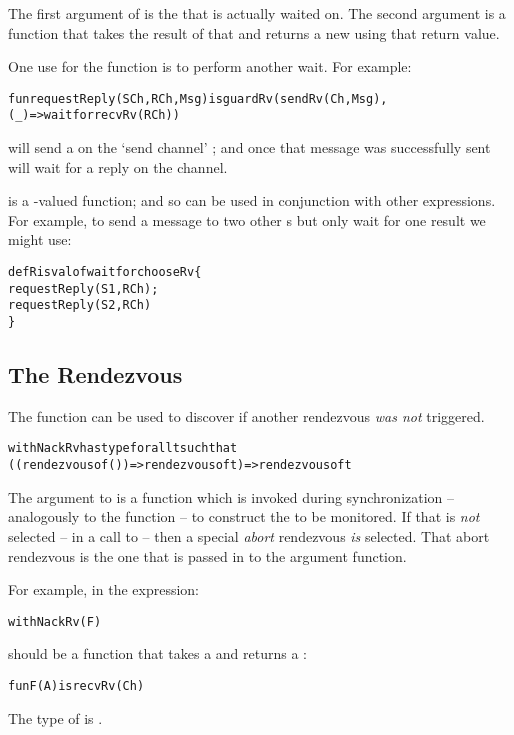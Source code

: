 The first argument of  is the  that is actually waited on. The second argument is a function that takes the result of that  and returns a new  using that return value.

One use for the  function is to perform another  wait. For example:
\begin{alltt}
fun requestReply(SCh,RCh,Msg) is guardRv(sendRv(Ch,Msg),
                                (_) => wait for recvRv(RCh))
\end{alltt}
will send a  on the `send channel' ; and once that message was successfully sent will wait for a reply on the  channel.

 is a -valued function; and so can be used in conjunction with other  expressions. For example, to send a message to two other s but only wait for one result we might use:
\begin{alltt}
def R is valof wait for chooseRv\{
  requestReply(S1,RCh);
  requestReply(S2,RCh)
  \}
\end{alltt}

\subsection{The  Rendezvous}
\label{nackRvFun}
The  function can be used to discover if another rendezvous \emph{was not} triggered.
\begin{alltt}
withNackRv has type for all t such that 
                    ((rendezvous of ())=>rendezvous of t)=>rendezvous of t
\end{alltt}

The argument to  is a function which is invoked during synchronization -- analogously to the  function -- to construct the  to be monitored. If that  is \emph{not} selected -- in a call to  -- then a special \emph{abort} rendezvous \emph{is} selected. That abort rendezvous is the one that is passed in to the argument function.

For example, in the expression:
\begin{alltt}
withNackRv(F)
\end{alltt}
 should be a function that takes a  and returns a :
\begin{alltt}
fun F(A) is recvRv(Ch)
\end{alltt}
The type of  is .

